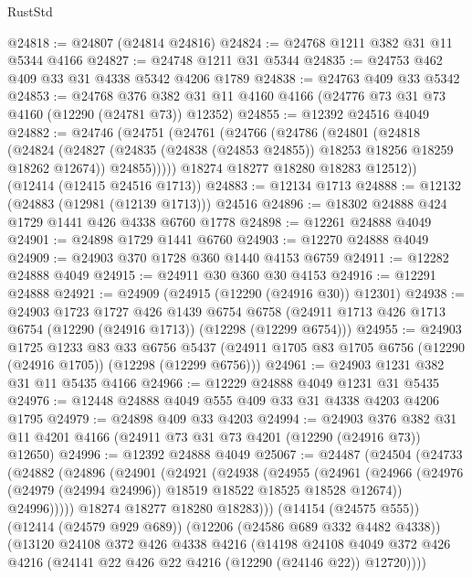 \begin{lexlean}{RustStd}
\begin{coremodule}
@24818 := @24807 (@24814 @24816)
@24824 := @24768 @1211 @382 @31 @11 @5344 @4166
@24827 := @24748 @1211 @31 @5344
@24835 := @24753 @462 @409 @33 @31 @4338 @5342 @4206 @1789
@24838 := @24763 @409 @33 @5342
@24853 := @24768
    @376
    @382
    @31
    @11
    @4160
    @4166
    (@24776 @73 @31 @73 @4160 (@12290 (@24781 @73)) @12352)
@24855 := @12392 @24516 @4049
@24882 := @24746
    (@24751
      (@24761
        (@24766
          (@24786
            (@24801
              (@24818
                (@24824
                  (@24827 (@24835 (@24838 (@24853 @24855)) @18253 @18256 @18259 @18262 @12674))
                  @24855)))))
        @18274
        @18277
        @18280
        @18283
        @12512))
    (@12414 (@12415 @24516 @1713))
@24883 := @12134 @1713
@24888 := @12132 (@24883 (@12981 (@12139 @1713))) @24516
@24896 := @18302 @24888 @424 @1729 @1441 @426 @4338 @6760 @1778
@24898 := @12261 @24888 @4049
@24901 := @24898 @1729 @1441 @6760
@24903 := @12270 @24888 @4049
@24909 := @24903 @370 @1728 @360 @1440 @4153 @6759
@24911 := @12282 @24888 @4049
@24915 := @24911 @30 @360 @30 @4153
@24916 := @12291 @24888
@24921 := @24909 (@24915 (@12290 (@24916 @30)) @12301)
@24938 := @24903
    @1723
    @1727
    @426
    @1439
    @6754
    @6758
    (@24911 @1713 @426 @1713 @6754 (@12290 (@24916 @1713)) (@12298 (@12299 @6754)))
@24955 := @24903
    @1725
    @1233
    @83
    @33
    @6756
    @5437
    (@24911 @1705 @83 @1705 @6756 (@12290 (@24916 @1705)) (@12298 (@12299 @6756)))
@24961 := @24903 @1231 @382 @31 @11 @5435 @4166
@24966 := @12229 @24888 @4049 @1231 @31 @5435
@24976 := @12448 @24888 @4049 @555 @409 @33 @31 @4338 @4203 @4206 @1795
@24979 := @24898 @409 @33 @4203
@24994 := @24903
    @376
    @382
    @31
    @11
    @4201
    @4166
    (@24911 @73 @31 @73 @4201 (@12290 (@24916 @73)) @12650)
@24996 := @12392 @24888 @4049
@25067 := @24487
    (@24504
      (@24733
        (@24882
          (@24896
            (@24901
              (@24921
                (@24938
                  (@24955
                    (@24961
                      (@24966 (@24976 (@24979 (@24994 @24996)) @18519 @18522 @18525 @18528 @12674))
                      @24996)))))
            @18274
            @18277
            @18280
            @18283)))
      (@14154 (@24575 @555))
      (@12414 (@24579 @929 @689))
      (@12206 (@24586 @689 @332 @4482 @4338))
      (@13120
        @24108
        @372
        @426
        @4338
        @4216
        (@14198
          @24108
          @4049
          @372
          @426
          @4216
          (@24141 @22 @426 @22 @4216 (@12290 (@24146 @22)) @12720))))

\end{coremodule}
\end{lexlean}
